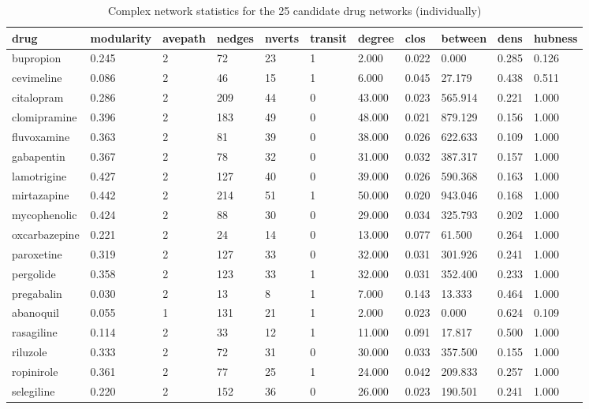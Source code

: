 \documentclass[preprint,11pt]{elsarticle}
\begin{document}
\begin{table}[h]
\centering \caption{Complex network statistics for the 25 candidate drug networks (individually) } \label{twentyfive}
\scriptsize
\begin{tabular}{lllllllllll}
\hline
   drug & modularity & avepath & nedges & nverts & transit & degree & clos & between & dens & hubness \\ 
  \hline
 bupropion & 0.245 & 2 & 72 &   23 & 1 & 2.000 & 0.022 & 0.000 & 0.285 & 0.126 \\ 
  cevimeline & 0.086 & 2 & 46 &   15 & 1 & 6.000 & 0.045 & 27.179 & 0.438 & 0.511 \\ 
  citalopram & 0.286 & 2 & 209 &   44 & 0 & 43.000 & 0.023 & 565.914 & 0.221 & 1.000 \\ 
  clomipramine & 0.396 & 2 & 183 &   49 & 0 & 48.000 & 0.021 & 879.129 & 0.156 & 1.000 \\ 
  fluvoxamine & 0.363 & 2 & 81 &   39 & 0 & 38.000 & 0.026 & 622.633 & 0.109 & 1.000 \\ 
  gabapentin & 0.367 & 2 & 78 &   32 & 0 & 31.000 & 0.032 & 387.317 & 0.157 & 1.000 \\ 
  lamotrigine & 0.427 & 2 & 127 &   40 & 0 & 39.000 & 0.026 & 590.368 & 0.163 & 1.000 \\ 
  mirtazapine & 0.442 & 2 & 214 &   51 & 1 & 50.000 & 0.020 & 943.046 & 0.168 & 1.000 \\ 
  mycophenolic & 0.424 & 2 & 88 &   30 & 0 & 29.000 & 0.034 & 325.793 & 0.202 & 1.000 \\ 
  oxcarbazepine & 0.221 & 2 & 24 &   14 & 0 & 13.000 & 0.077 & 61.500 & 0.264 & 1.000 \\ 
  paroxetine & 0.319 & 2 & 127 &   33 & 0 & 32.000 & 0.031 & 301.926 & 0.241 & 1.000 \\ 
  pergolide & 0.358 & 2 & 123 &   33 & 1 & 32.000 & 0.031 & 352.400 & 0.233 & 1.000 \\ 
  pregabalin & 0.030 & 2 & 13 &    8 & 1 & 7.000 & 0.143 & 13.333 & 0.464 & 1.000 \\ 
  abanoquil & 0.055 & 1 & 131 &   21 & 1 & 2.000 & 0.023 & 0.000 & 0.624 & 0.109 \\ 
  rasagiline & 0.114 & 2 & 33 &   12 & 1 & 11.000 & 0.091 & 17.817 & 0.500 & 1.000 \\ 
  riluzole & 0.333 & 2 & 72 &   31 & 0 & 30.000 & 0.033 & 357.500 & 0.155 & 1.000 \\ 
  ropinirole & 0.361 & 2 & 77 &   25 & 1 & 24.000 & 0.042 & 209.833 & 0.257 & 1.000 \\ 
  selegiline & 0.220 & 2 & 152 &   36 & 0 & 26.000 & 0.023 & 190.501 & 0.241 & 1.000 \\ 

\end{tabular}
\end{table}
\end{document}
